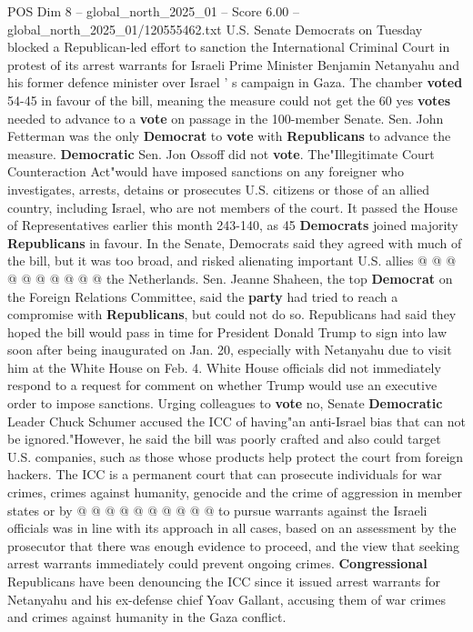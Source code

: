 \begin{textsample}{POS Dim 8 – global\_north\_2025\_01 – Score 6.00 – global\_north\_2025\_01/120555462.txt}  \label{ex:f8_pos_295}
U.S.
Senate Democrats on Tuesday blocked a Republican-led effort to sanction the International Criminal Court in protest of its arrest warrants for Israeli Prime Minister Benjamin Netanyahu and his former defence minister over Israel ' s campaign in Gaza.
The chamber \textbf{voted} 54-45 in favour of the bill, meaning the measure could not get the 60 yes \textbf{votes} needed to advance to a \textbf{vote} on passage in the 100-member Senate.
Sen.
John Fetterman was the only \textbf{Democrat} to \textbf{vote} with \textbf{Republicans} to advance the measure. \textbf{Democratic} Sen.
Jon Ossoff did not \textbf{vote}.
The"Illegitimate Court Counteraction Act"would have imposed sanctions on any foreigner who investigates, arrests, detains or prosecutes U.S. citizens or those of an allied country, including Israel, who are not members of the court.
It passed the House of Representatives earlier this month 243-140, as 45 \textbf{Democrats} joined majority \textbf{Republicans} in favour.
In the Senate, Democrats said they agreed with much of the bill, but it was too broad, and risked alienating important U.S. allies @ @ @ @ @ @ @ @ @ @ the Netherlands.
Sen.
Jeanne Shaheen, the top \textbf{Democrat} on the Foreign Relations Committee, said the \textbf{party} had tried to reach a compromise with \textbf{Republicans}, but could not do so.
Republicans had said they hoped the bill would pass in time for President Donald Trump to sign into law soon after being inaugurated on Jan. 20, especially with Netanyahu due to visit him at the White House on Feb. 4.
White House officials did not immediately respond to a request for comment on whether Trump would use an executive order to impose sanctions.
Urging colleagues to \textbf{vote} no, Senate \textbf{Democratic} Leader Chuck Schumer accused the ICC of having"an anti-Israel bias that can not be ignored."However, he said the bill was poorly crafted and also could target U.S. companies, such as those whose products help protect the court from foreign hackers.
The ICC is a permanent court that can prosecute individuals for war crimes, crimes against humanity, genocide and the crime of aggression in member states or by @ @ @ @ @ @ @ @ @ @ to pursue warrants against the Israeli officials was in line with its approach in all cases, based on an assessment by the prosecutor that there was enough evidence to proceed, and the view that seeking arrest warrants immediately could prevent ongoing crimes. \textbf{Congressional} Republicans have been denouncing the ICC since it issued arrest warrants for Netanyahu and his ex-defense chief Yoav Gallant, accusing them of war crimes and crimes against humanity in the Gaza conflict.

\end{textsample}
